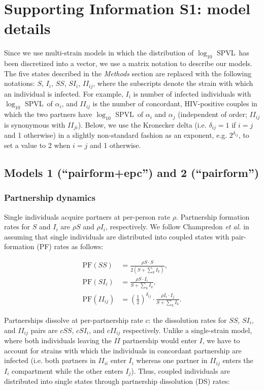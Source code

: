 \documentclass[10pt,letterpaper]{article}
\date{}
\newcommand{\khalf}{\left(\frac{1}{2}\right)^{\delta_{ij}}}  %
\newcommand{\Lspvl}{$\log_{10}$ SPVL}
\newcommand{\etal}{\textit{et al.}}
\newcommand{\PF}{\textrm{PF}}
\begin{document}
\section*{Supporting Information S1: model details}
\label{S1_Appendix}

Since we use multi-strain models in which the distribution of \Lspvl\ has been discretized into a vector, we use a matrix notation to describe our models. The five states described in the \emph{Methods} section are replaced with the following notations: $S$, $I_i$, $SS$, $SI_i$, $II_{ij}$, where the subscripts denote the strain with which an individual is infected. For example, $I_i$ is number of infected individuals with \Lspvl\ of $\alpha_i$, and $II_{ij}$ is the number of concordant, HIV-positive couples in which the two partners have \Lspvl\ of $\alpha_i$ and $\alpha_j$ (independent of order; $II_{ij}$ is synonymous with $II_{ji}$). 
Below, we use the Kronecker delta (i.e. $\delta_{ij}=1$ if $i=j$ and 1 otherwise) in a slightly non-standard fashion as an exponent, e.g. $2^{\delta_{ij}}$, to set a value to 2 when $i=j$ and 1 otherwise.

\subsection*{Models 1 (``pairform+epc'') and 2 (``pairform'')}

\subsubsection*{Partnership dynamics}

Single individuals acquire partners at per-person rate $\rho$. Partnership formation rates for $S$ and $I_i$ are $\rho S$ and $\rho I_i$, respectively. We follow Champredon \etal \cite{champredon_hiv_2013} in assuming that single individuals are distributed into coupled states with pair-formation (PF) rates as follows:

\begin{equation}
\begin{aligned}
\PF(SS) &= \frac{\rho S \cdot S}{2 (S + \sum_k I_k)},\\
\PF(SI_i) &= \frac{\rho S \cdot I_i}{S + \sum_k I_k},\\
\PF(II_{ij}) &= \khalf \cdot \frac{\rho I_i \cdot I_j}{S + \sum_k I_k}.
\end{aligned}
\end{equation}

Partnerships dissolve at per-partnership rate $c$: the dissolution rates for $SS$, $SI_i$, and $II_{ij}$ pairs are $c SS$, $c SI_i$, and $c II_{ij}$ respectively. Unlike a single-strain model, where both individuals leaving the $II$ partnership would enter $I$, we have to account for strains with which the individuals in concordant partnership are infected (i.e. both partners in $II_{ii}$ enter $I_i$ whereas one partner in $II_{ij}$ enters the $I_i$ compartment while the other enters $I_j$). Thus, coupled individuals are distributed into single states through partnership dissolution (DS) rates:
\end{document}
